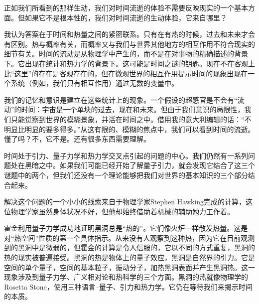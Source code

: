 正如我们所看到的那样生动，我们对时间流逝的体验不需要反映现实的一个基本方面。但如果它不是根本性的，我们对时间流逝的生动体验，它来自哪里？

   我认为答案在于时间和热量之间的紧密联系。只有在有热的时候，过去和未来才会有区别。热与概率有关，而概率又与我们与世界其他地方的相互作用不符合现实的细节有关。时间的流动是从物理学中产生的，而不是在对事物的精确描述的背景下。它出现在统计和热力学的背景下。这可能是时间之谜的钥匙。现在不在客观上比“这里”的存在是客观存在的，但在微观世界的相互作用提示时间的现象出现在一个系统（例如，我们只有相互作用）通过无数的变量中。

   我们的记忆和意识是建立在这些统计上的现象。一个假设的超感官是不会有“流动”的时间：宇宙是一个单块的过去，现在和未来。但由于我们意识的局限性，我们只能觉察到世界的模糊景象，并活在时间之中。借用我的意大利编辑的话：“不明显比明显的要多得多。”从这有限的、模糊的焦点中，我们可以看到时间的流逝。懂了吗？不，它不是。还有很多东西需要理解。

时间处于引力、量子力学和热力学交叉点引起的问题的中心。我们仍然有一系列问题处在黑暗之中。如果我们可能已经开始了解量子引力，就会发现它结合了这三个谜题中的两个，但我们还没有一个理论能够把我们对世界的基本知识的三个部分结合起来。

   解决这个问题的一个小小的线索来自于物理学家Stephen Hawking完成的计算，这位物理学家虽然身体状况不好，但他却始终借助着机械的辅助勉力工作着。

   霍金利用量子力学成功地证明黑洞总是“热的”。它们像火炉一样散发热量。这是对“热空间”性质的第一个具体指示。从来没有人观察到这种热，因为它在目前观测到的黑洞中是微弱的，但霍金的计算是令人信服的，它以不同的方式重复，黑洞的热的现实被普遍接受。黑洞的热是物体上的量子效应，黑洞是自然界的引力。它是空间的单个量子，空间的基本粒子，振动分子，加热黑洞表面并产生黑洞热。这一现象涉及到量子力学、广义相对论和热科学的三个方面。黑洞的热就像物理学的Rosetta Stone，使用三种语言–量子、引力和热力学。它仍在等待我们来揭示时间的本质。

\noindent
